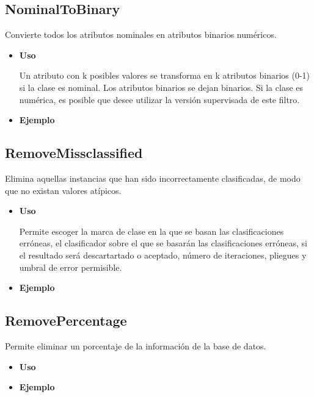	\subsection{NominalToBinary}
	\begin{justify}
	Convierte todos los atributos nominales en atributos binarios numéricos. 	
	\end{justify}
	\begin{itemize}
		\item \textbf{Uso}
	\begin{justify}
	Un atributo con k posibles valores se transforma en k atributos binarios (0-1) si la clase es nominal. Los atributos binarios se dejan binarios. Si la clase es numérica, es posible que desee utilizar la versión supervisada de este filtro.	
	\end{justify}
		\item \textbf{Ejemplo}
	\end{itemize}

	\subsection{RemoveMissclassified}
	\begin{justify}
	Elimina aquellas instancias que han sido incorrectamente clasificadas, de modo que no existan valores atípicos.
	\end{justify}
	\begin{itemize}
		\item \textbf{Uso}
	\begin{justify}
	Permite escoger la marca de clase en la que se basan las clasificaciones erróneas, el clasificador 	sobre el que se basarán las clasificaciones erróneas, si el resultado será descartartado o aceptado, número de iteraciones, pliegues y umbral de error permisible.
	\end{justify}
		\item \textbf{Ejemplo}
	\end{itemize}

	\subsection{RemovePercentage}
	\begin{justify}
	Permite eliminar un porcentaje de la información de la base de datos.
	\end{justify}
	\begin{itemize}
		\item \textbf{Uso}
	\begin{justify}

	\end{justify}
		\item \textbf{Ejemplo}
	\end{itemize}

